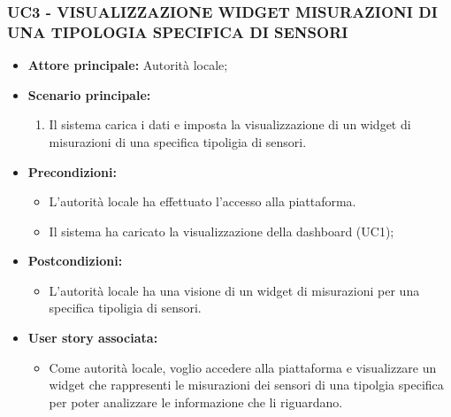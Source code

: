 \subsubsection{UC3 - VISUALIZZAZIONE WIDGET MISURAZIONI DI UNA TIPOLOGIA SPECIFICA DI SENSORI}

\begin{itemize}
    \item \textbf{Attore principale:} Autorità locale;
    \item \textbf{Scenario principale:}
        \begin{enumerate}
            \item Il sistema carica i dati e imposta la visualizzazione di un widget di misurazioni di una specifica tipoligia di sensori.
        \end{enumerate}
    \item \textbf{Precondizioni:}
        \begin{itemize}
            \item L'autorità locale ha effettuato l'accesso alla piattaforma.
            \item Il sistema ha caricato la visualizzazione della dashboard (UC1);
        \end{itemize}
    \item \textbf{Postcondizioni:}
        \begin{itemize}
            \item   L'autorità locale ha una visione di un widget di misurazioni per una specifica tipoligia di sensori.
        \end{itemize}
    \item \textbf{User story associata:}
        \begin{itemize}
            \item Come autorità locale, voglio accedere alla piattaforma e visualizzare un widget che rappresenti le misurazioni dei sensori di una tipolgia specifica per poter analizzare le informazione che li riguardano.
        \end{itemize}
\end{itemize}
